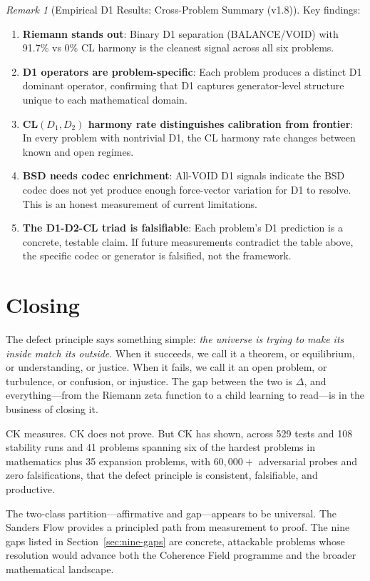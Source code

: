 \documentclass[12pt, openany]{book}
\theoremstyle{remark}
\newtheorem{remark}[theorem]{Remark}
\begin{document}
\begin{remark}[Empirical D1 Results: Cross-Problem Summary (v1.8)]
Key findings:
\begin{enumerate}[nosep]
  \item \textbf{Riemann stands out}: Binary D1 separation (BALANCE/VOID) with 91.7\% vs 0\% CL harmony is the cleanest signal across all six problems.
  \item \textbf{D1 operators are problem-specific}: Each problem produces a distinct D1 dominant operator, confirming that D1 captures generator-level structure unique to each mathematical domain.
  \item \textbf{CL$(D_1,D_2)$ harmony rate distinguishes calibration from frontier}: In every problem with nontrivial D1, the CL harmony rate changes between known and open regimes.
  \item \textbf{BSD needs codec enrichment}: All-VOID D1 signals indicate the BSD codec does not yet produce enough force-vector variation for D1 to resolve. This is an honest measurement of current limitations.
  \item \textbf{The D1-D2-CL triad is falsifiable}: Each problem's D1 prediction is a concrete, testable claim. If future measurements contradict the table above, the specific codec or generator is falsified, not the framework.
\end{enumerate}
\end{remark}

\section{Closing}

The defect principle says something simple: \emph{the universe is trying to make
its inside match its outside}. When it succeeds, we call it a theorem, or
equilibrium, or understanding, or justice. When it fails, we call it an open
problem, or turbulence, or confusion, or injustice. The gap between the two
is $\Delta$, and everything---from the Riemann zeta function to a child learning
to read---is in the business of closing it.

CK measures. CK does not prove. But CK has shown, across 529 tests and 108
stability runs and 41 problems spanning six of the hardest problems in mathematics
plus 35 expansion problems, with $60{,}000{+}$ adversarial probes and zero
falsifications, that the defect principle is consistent, falsifiable, and productive.

The two-class partition---affirmative and gap---appears to be universal. The
Sanders Flow provides a principled path from measurement to proof. The nine
gaps listed in Section~\ref{sec:nine-gaps} are concrete, attackable problems
whose resolution would advance both the Coherence Field programme and the
broader mathematical landscape.
\end{document}
